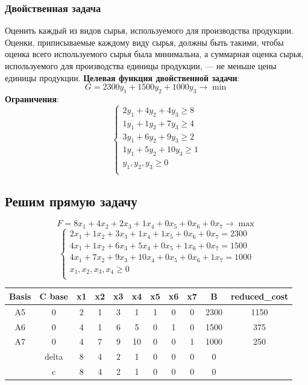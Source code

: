 \documentclass[17pt]{extarticle}
\begin{document}
\subsubsection*{Двойственная задача}
Оценить каждый из видов сырья, используемого для производства продукции. Оценки, приписываемые каждому виду сырья, должны быть такими, чтобы оценка всего используемого сырья была минимальна, а суммарная оценка сырья, используемого для производства единицы продукции, — не меньше цены единицы продукции.
\textbf{Целевая функция двойственной задачи}:
\[
    G = 2300y_1 + 1500y_2 + 1000y_3 \to \min
\]
\textbf{Ограничения}:
\[
    \begin{cases}
        2y_1 + 4y_2 + 4y_3 \geq 8  \\
        1y_1 + 1y_2 + 7y_3 \geq 4  \\
        3y_1 + 6y_2 + 9y_3 \geq 2  \\
        1y_1 + 5y_2 + 10y_3 \geq 1 \\
        y_1, y_2, y_3 \geq 0       \\
    \end{cases}
\]

\subsection*{Решим прямую задачу}

\[
    F = 8x_1 + 4x_2 + 2x_3 + 1x_4 + 0x_5 + 0x_6 + 0x_7 \to \max
\]
\[
    \begin{cases}
        2x_1 + 1x_2 + 3x_3 + 1x_4 + 1x_5 + 0x_6 + 0x_7 = 2300  \\
        4x_1 + 1x_2 + 6x_3 + 5x_4 + 0x_5 + 1x_6 + 0x_7 = 1500  \\
        4x_1 + 7x_2 + 9x_3 + 10x_4 + 0x_5 + 0x_6 + 1x_7 = 1000 \\
        x_1, x_2, x_3, x_4 \geq 0                              \\
    \end{cases}
\]

\begin{table}[h!]
    \centering
    \begin{tabular}{c|c|ccccccc|c|c}
        \toprule
        Basis & C base & x1 & x2 & x3 & x4 & x5 & x6 & x7 & B    & reduced\_cost \\
        \midrule
        A5    & 0      & 2  & 1  & 3  & 1  & 1  & 0  & 0  & 2300 & 1150          \\
        A6    & 0      & 4  & 1  & 6  & 5  & 0  & 1  & 0  & 1500 & 375           \\
        A7    & 0      & 4  & 7  & 9  & 10 & 0  & 0  & 1  & 1000 & 250           \\
        \midrule
              & delta  & 8  & 4  & 2  & 1  & 0  & 0  & 0  & 0    &               \\
              & c      & 8  & 4  & 2  & 1  & 0  & 0  & 0  & 0    &               \\
        \bottomrule
    \end{tabular}
\end{table}
\end{document}
